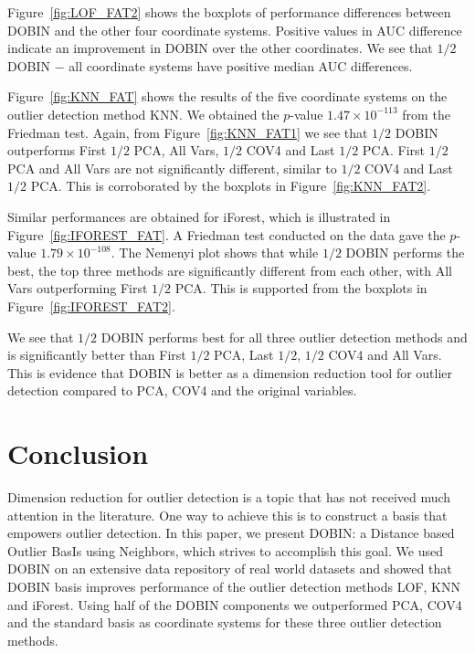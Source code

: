 \documentclass[letter,12pt]{article}
\begin{document}
Figure~\ref{fig:LOF_FAT2} shows the boxplots of performance differences between  {\color{blue} DOBIN and the other four } coordinate systems. Positive values in AUC difference {\color{blue} indicate an improvement in DOBIN over the other coordinates. }  We see that $1/2$ DOBIN $-$ {\color{blue} all coordinate systems have positive median AUC differences}. 

Figure~\ref{fig:KNN_FAT} shows the results of the {\color{blue} five } coordinate systems on the outlier detection method KNN. We obtained the $p$-value $1.47\times 10^{-113}$ from the Friedman test. Again, from Figure~\ref{fig:KNN_FAT1} we see that $1/2$ DOBIN outperforms {\color{blue} First $1/2$ PCA,  All Vars, $1/2$ COV4 and Last $1/2$ PCA. First $1/2$ PCA and All Vars are not significantly different, similar to $1/2$ COV4 and Last $1/2$ PCA. }
This is corroborated by the boxplots in Figure~\ref{fig:KNN_FAT2}. %

Similar performances are obtained for iForest, which is illustrated in Figure~\ref{fig:IFOREST_FAT}. A Friedman test conducted on the data gave the $p$-value  $1.79 \times 10^{-108}$. The Nemenyi plot shows that while $1/2$ DOBIN performs the best, {\color{blue} the top} three methods are significantly different from each other, with All Vars outperforming First $1/2$ PCA.  This is supported from the boxplots in Figure~\ref{fig:IFOREST_FAT2}. %

We see that $1/2$ DOBIN performs best for all three outlier detection methods and is significantly better than {\color{blue} First $1/2$ PCA, Last $1/2$, $1/2$ COV4} and All Vars. This is evidence that DOBIN is better as a dimension reduction tool for outlier detection compared to PCA, {\color{blue} COV4} and the original variables. %



\section{Conclusion}
Dimension reduction for outlier detection is a topic that has not received much attention in the literature. One way to achieve this is to construct a basis that empowers outlier detection. In this paper, we present DOBIN: a Distance based Outlier BasIs using Neighbors, which strives to accomplish this goal. We used DOBIN on an extensive data repository of real world datasets and showed that DOBIN basis improves performance of the outlier detection methods LOF, KNN and iForest. Using half of the DOBIN components we outperformed PCA, {\color{blue} COV4}  and the standard basis as coordinate systems for these three outlier detection methods.
\end{document}
